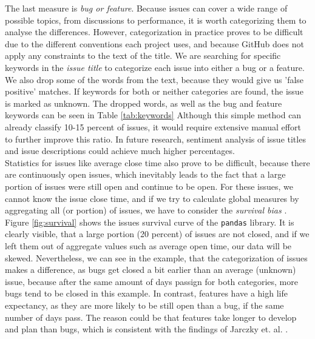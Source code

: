 The last measure is \textit{bug or feature}. Because issues can cover a wide range of possible topics, from discussions to performance, it is worth categorizing them to analyse the differences. However, categorization in practice proves to be difficult due to the different conventions each project uses, and because GitHub does not apply any constraints to the text of the title. We are searching for specific keywords in the \textit{issue title} to categorize each issue into either a bug or a feature. We also drop some of the words from the text, because they would give us 'false positive' matches. If keywords for both or neither categories are found, the issue is marked as unknown. The dropped words, as well as the bug and feature keywords can be seen in Table \ref{tab:keywords} Although this simple method can already classify 10-15 percent of issues, it would require extensive manual effort to further improve this ratio. In future research, sentiment analysis of issue titles and issue descriptions could achieve much higher percentages. \\

Statistics for issues like average close time also prove to be difficult, because there are continuously open issues, which inevitably leads to the fact that a large portion of issues were still open and continue to be open. For these issues, we cannot know the issue close time, and if we try to calculate global measures by aggregating all (or portion) of issues, we have to consider the \textit{survival bias} \cite{jarczykSurgicalTeamsGitHub2018}. Figure \ref{fig:survival} shows the issues survival curve of the \texttt{pandas} library. It is clearly visible, that a large portion (20 percent) of issues are not closed, and if we left them out of aggregate values such as average open time, our data will be skewed. Nevertheless, we can see in the example, that the categorization of issues makes a difference, as bugs get closed a bit earlier than an average (unknown) issue, because after the same amount of days passign for both categories, more bugs tend to be closed in this example. In contrast, features have a high life expectancy, as they are more likely to be still open than a bug, if the same number of days pass. The reason could be that features take longer to develop and plan than bugs, which is consistent with the findings of Jarczky et. al. \cite{jarczykSurgicalTeamsGitHub2018}. \\

